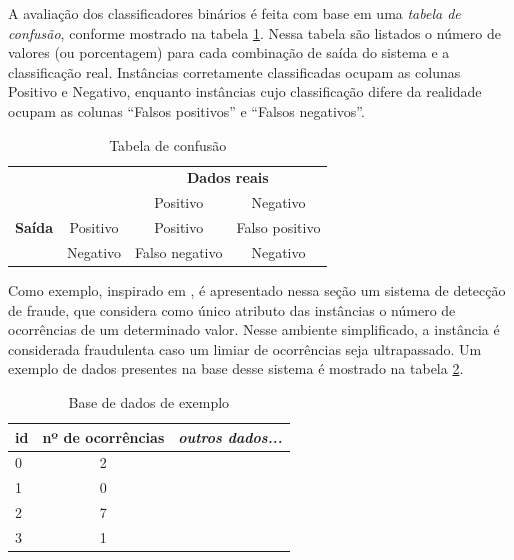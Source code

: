 A avaliação dos classificadores binários é feita com base em uma \emph{tabela de confusão}, conforme mostrado na tabela \ref{fraud:confusion}. Nessa tabela são listados o número de valores (ou porcentagem) para cada combinação de saída do sistema e a classificação real. Instâncias corretamente classificadas ocupam as colunas Positivo e Negativo, enquanto instâncias cujo classificação difere da realidade ocupam as colunas ``Falsos positivos'' e ``Falsos negativos''.

\renewcommand{\arraystretch}{1.5}
\begin{table}[h!]
    \vspace{1cm}
    \caption{Tabela de confusão}
    \centering
    \begin{tabular}{c l c c}
        & & \multicolumn{2}{c}{\textbf{Dados reais}} \\
        \multirow{3}{5mm}{\begin{sideways}\parbox{20mm}{\textbf{Saída}}\end{sideways}} & \multicolumn{1}{c|}{} & Positivo & Negativo \\
        \cline{2-4}
        & \multicolumn{1}{c|}{Positivo} & Positivo & Falso positivo\\
        & \multicolumn{1}{c|}{Negativo} & Falso negativo & Negativo\\
    \end{tabular}
    \label{fraud:confusion}
    \vspace{1cm}
\end{table}

Como exemplo, inspirado em \citet{Bewick2004}, é apresentado nessa seção um sistema de detecção de fraude, que considera como único atributo das instâncias o número de ocorrências de um determinado valor. Nesse ambiente simplificado, a instância é considerada fraudulenta caso um limiar de ocorrências seja ultrapassado. Um exemplo de dados presentes na base desse sistema é mostrado na tabela \ref{fraud:ex_data}.

\renewcommand{\arraystretch}{1.5}
\begin{table}[h!]
    \vspace{2mm}
    \caption{Base de dados de exemplo}
    \centering
    \begin{tabular}{l|c|l}
        id & nº de ocorrências & \emph{outros dados...} \\
        \hline
        0 & 2           & \\
        1 & 0           & \\
        2 & 7           & \\
        3 & 1           & \\
    \end{tabular}
    \label{fraud:ex_data}
    \vspace{2mm}
\end{table}

